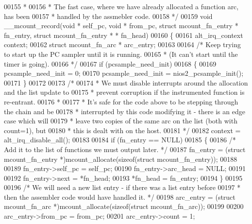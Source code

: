 \begin{DoxyCode}
{00155 \textcolor{comment}{ *}
00156 \textcolor{comment}{ * The fast case, where we have already allocated a function arc, has been}
00157 \textcolor{comment}{ * handled by the assmebler code.}
00158 \textcolor{comment}{ */}
00159 \textcolor{keywordtype}{void} __mcount_record(\textcolor{keywordtype}{void} * self_pc, \textcolor{keywordtype}{void} * from_pc, \textcolor{keyword}{struct} mcount_fn_entry * fn\_entry, \textcolor{keyword}{struct} 
      mcount_fn_entry * * fn\_head)
00160 \{
00161   alt_irq_context context;
00162   \textcolor{keyword}{struct }mcount_fn_arc * arc\_entry;
00163 
00164   \textcolor{comment}{/* Keep trying to start up the PC sampler until it is running.}
00165 \textcolor{comment}{   * (It can't start until the timer is going).}
00166 \textcolor{comment}{   */}
00167   \textcolor{keywordflow}{if} (pcsample\_need\_init)
00168   \{
00169     pcsample\_need\_init = 0;
00170     pcsample\_need\_init = nios2_pcsample_init();
00171   \}
00172 
00173   \textcolor{comment}{/*}
00174 \textcolor{comment}{   * We must disable interrupts around the allocation and the list update to}
00175 \textcolor{comment}{   * prevent corruption if the instrumented function is re-entrant.}
00176 \textcolor{comment}{   *}
00177 \textcolor{comment}{   * It's safe for the code above to be stepping through the chain and be}
00178 \textcolor{comment}{   * interrupted by this code modifying it - there is an edge case which will}
00179 \textcolor{comment}{   * leave two copies of the same arc on the list (both with count=1), but}
00180 \textcolor{comment}{   * this is dealt with on the host.}
00181 \textcolor{comment}{   */}
00182   context = alt_irq_disable_all();
00183 
00184   \textcolor{keywordflow}{if} (fn\_entry == NULL)
00185   \{
00186     \textcolor{comment}{/* Add it to the list of functions we must output later. */}
00187     fn\_entry = (\textcolor{keyword}{struct }mcount_fn_entry *)mcount_allocate(\textcolor{keyword}{sizeof}(\textcolor{keyword}{struct} 
      mcount_fn_entry));
00188 
00189     fn\_entry->self_pc = self_pc;
00190     fn\_entry->arc_head = NULL;
00191 
00192     fn\_entry->next = *fn\_head;
00193     *fn\_head = fn\_entry;
00194   \}
00195 
00196   \textcolor{comment}{/* We will need a new list entry - if there was a list entry before}
00197 \textcolor{comment}{   * then the assembler code would have handled it. */}
00198   arc\_entry = (\textcolor{keyword}{struct }mcount_fn_arc *)mcount_allocate(\textcolor{keyword}{sizeof}(\textcolor{keyword}{struct} 
      mcount_fn_arc));
00199 
00200   arc\_entry->from_pc = from_pc;
00201   arc\_entry->count = 1;
}
\end{DoxyCode}

